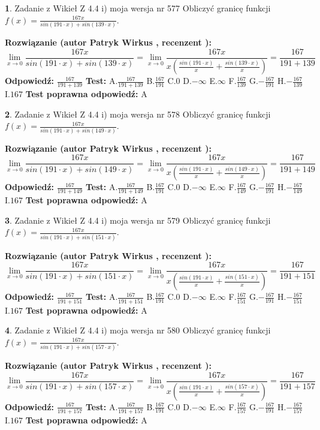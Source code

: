 \documentclass[12pt, a4paper]{article}
\theoremstyle{definition} %
\newtheorem{zad}{}
\newcommand{\zadStart}[1]{\begin{zad}#1\newline}
\newcommand{\zadStop}{\end{zad}}
\newcommand{\rozwStart}[2]{\noindent \textbf{Rozwiązanie (autor #1 , recenzent #2): }\newline}
\newcommand{\rozwStop}{\newline}
\newcommand{\odpStart}{\noindent \textbf{Odpowiedź:}\newline}
\newcommand{\odpStop}{\newline}
\newcommand{\testStart}{\noindent \textbf{Test:}\newline}
\newcommand{\testStop}{\newline}
\newcommand{\kluczStart}{\noindent \textbf{Test poprawna odpowiedź:}\newline}
\newcommand{\kluczStop}{\newline}
\begin{document}
\zadStart{Zadanie z Wikieł Z 4.4 i) moja wersja nr 577}
Obliczyć granicę funkcji $f(x)=\frac{167x}{sin(191\cdot x) +sin(139\cdot x)}$.
\zadStop
\rozwStart{Patryk Wirkus}{}
$$\lim\limits_{x\to 0}\frac{167x}{sin(191\cdot x) +sin(139\cdot x)}=\lim\limits_{x\to 0}\frac{167x}{x(\frac{sin(191\cdot x)}{x}+\frac{sin(139\cdot x)}{x})}=\frac{167}{191+139}$$
\rozwStop
\odpStart
$\frac{167}{191+139}$
\odpStop
\testStart
A.$\frac{167}{191+139}$
B.$\frac{167}{191}$
C.$0$
D.$-\infty$
E.$\infty$
F.$\frac{167}{139}$
G.$-\frac{167}{191}$
H.$-\frac{167}{139}$
I.$167$
\testStop
\kluczStart
A
\kluczStop



\zadStart{Zadanie z Wikieł Z 4.4 i) moja wersja nr 578}
Obliczyć granicę funkcji $f(x)=\frac{167x}{sin(191\cdot x) +sin(149\cdot x)}$.
\zadStop
\rozwStart{Patryk Wirkus}{}
$$\lim\limits_{x\to 0}\frac{167x}{sin(191\cdot x) +sin(149\cdot x)}=\lim\limits_{x\to 0}\frac{167x}{x(\frac{sin(191\cdot x)}{x}+\frac{sin(149\cdot x)}{x})}=\frac{167}{191+149}$$
\rozwStop
\odpStart
$\frac{167}{191+149}$
\odpStop
\testStart
A.$\frac{167}{191+149}$
B.$\frac{167}{191}$
C.$0$
D.$-\infty$
E.$\infty$
F.$\frac{167}{149}$
G.$-\frac{167}{191}$
H.$-\frac{167}{149}$
I.$167$
\testStop
\kluczStart
A
\kluczStop



\zadStart{Zadanie z Wikieł Z 4.4 i) moja wersja nr 579}
Obliczyć granicę funkcji $f(x)=\frac{167x}{sin(191\cdot x) +sin(151\cdot x)}$.
\zadStop
\rozwStart{Patryk Wirkus}{}
$$\lim\limits_{x\to 0}\frac{167x}{sin(191\cdot x) +sin(151\cdot x)}=\lim\limits_{x\to 0}\frac{167x}{x(\frac{sin(191\cdot x)}{x}+\frac{sin(151\cdot x)}{x})}=\frac{167}{191+151}$$
\rozwStop
\odpStart
$\frac{167}{191+151}$
\odpStop
\testStart
A.$\frac{167}{191+151}$
B.$\frac{167}{191}$
C.$0$
D.$-\infty$
E.$\infty$
F.$\frac{167}{151}$
G.$-\frac{167}{191}$
H.$-\frac{167}{151}$
I.$167$
\testStop
\kluczStart
A
\kluczStop



\zadStart{Zadanie z Wikieł Z 4.4 i) moja wersja nr 580}
Obliczyć granicę funkcji $f(x)=\frac{167x}{sin(191\cdot x) +sin(157\cdot x)}$.
\zadStop
\rozwStart{Patryk Wirkus}{}
$$\lim\limits_{x\to 0}\frac{167x}{sin(191\cdot x) +sin(157\cdot x)}=\lim\limits_{x\to 0}\frac{167x}{x(\frac{sin(191\cdot x)}{x}+\frac{sin(157\cdot x)}{x})}=\frac{167}{191+157}$$
\rozwStop
\odpStart
$\frac{167}{191+157}$
\odpStop
\testStart
A.$\frac{167}{191+157}$
B.$\frac{167}{191}$
C.$0$
D.$-\infty$
E.$\infty$
F.$\frac{167}{157}$
G.$-\frac{167}{191}$
H.$-\frac{167}{157}$
I.$167$
\testStop
\kluczStart
A
\kluczStop
\end{document}
